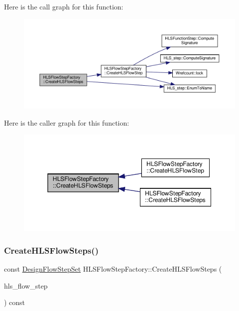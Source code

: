 Here is the call graph for this function\+:
\nopagebreak
\begin{figure}[H]
\begin{center}
\leavevmode
\includegraphics[width=350pt]{dd/d39/classHLSFlowStepFactory_a68d109cc1cd6b661a29f89bf76199e93_cgraph}
\end{center}
\end{figure}
Here is the caller graph for this function\+:
\nopagebreak
\begin{figure}[H]
\begin{center}
\leavevmode
\includegraphics[width=350pt]{dd/d39/classHLSFlowStepFactory_a68d109cc1cd6b661a29f89bf76199e93_icgraph}
\end{center}
\end{figure}
\mbox{\label{classHLSFlowStepFactory_a67751f9e519fe68cad94fd61d08a02f8}} 
\subsubsection{\texorpdfstring{Create\+H\+L\+S\+Flow\+Steps()}{CreateHLSFlowSteps()}\hspace{0.1cm}{\footnotesize\ttfamily [2/3]}}
{\footnotesize\ttfamily const \hyperlink{classDesignFlowStepSet}{Design\+Flow\+Step\+Set} H\+L\+S\+Flow\+Step\+Factory\+::\+Create\+H\+L\+S\+Flow\+Steps (\begin{DoxyParamCaption}\item[{const std\+::pair$<$ \hyperlink{hls__step_8hpp_ada16bc22905016180e26fc7e39537f8d}{H\+L\+S\+Flow\+Step\+\_\+\+Type}, \hyperlink{hls__step_8hpp_a5fdd2edf290c196531d21d68e13f0e74}{H\+L\+S\+Flow\+Step\+Specialization\+Const\+Ref} $>$ \&}]{hls\+\_\+flow\+\_\+step }\end{DoxyParamCaption}) const}



